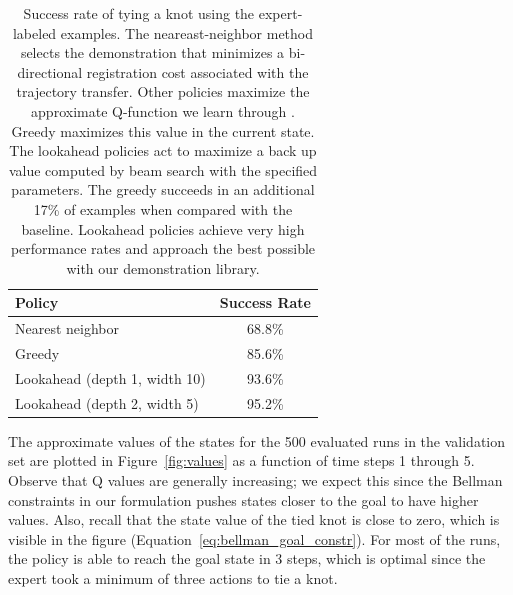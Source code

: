 \begin{table}
  \centering
  \begin{tabular}{lc}
    \toprule
      Policy & Success Rate\\
    \midrule
      Nearest neighbor \cite{Schulmanetal_ISRR2013} & 68.8\% \\
    \midrule
      Greedy & 85.6\% \\
      Lookahead (depth 1, width 10) & 93.6\% \\
      Lookahead (depth 2, width 5) & 95.2\% \\
    \bottomrule
  \end{tabular}
  \caption{Success rate of tying a knot using the expert-labeled examples. The neareast-neighbor method selects
           the demonstration that minimizes a bi-directional registration cost associated with the trajectory transfer.
           Other policies maximize the approximate Q-function we learn through \mmql{}. Greedy maximizes this value in the current
           state. The lookahead policies act to maximize a back up value computed by beam search with the specified parameters. The greedy
           succeeds in an additional 17\% of examples when compared with the baseline. Lookahead policies achieve very high performance rates
           and approach the best possible with our demonstration library.}
  \label{table:performance}
\end{table}

The approximate values of the states for the 500 evaluated runs in the validation set are plotted in Figure~\ref{fig:values} as a function of time steps 1 through 5.
Observe that Q values are generally increasing; we expect this since the Bellman constraints in our formulation pushes states closer to the goal to have higher values.
Also, recall that the state value of the tied knot is close to zero, which is visible in the figure (Equation~\ref{eq:bellman_goal_constr}).
For most of the runs, the policy is able to reach the goal state in 3 steps, which is optimal since the expert took a minimum of three actions to tie a knot.

